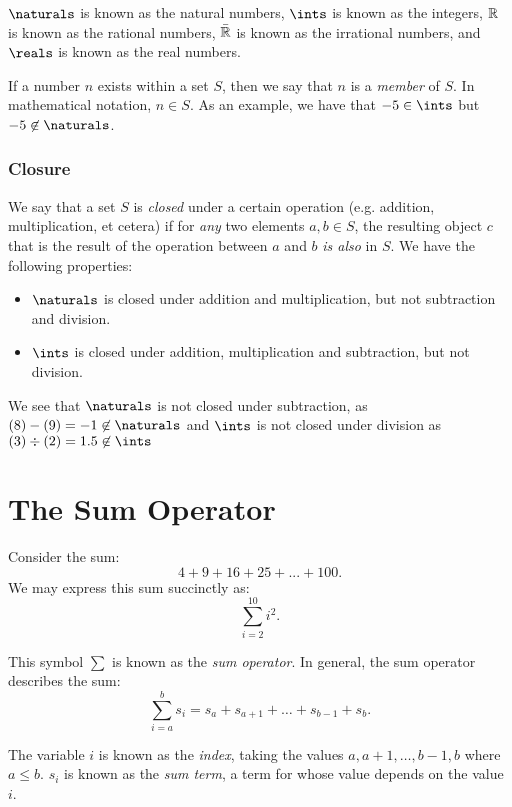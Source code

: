 \documentclass[../proofs.tex]{subfiles}
\begin{document}
  $\naturals$ is known as the natural numbers, $\ints$ is known as the integers,
  $\mathbb{R}$ is known as the rational numbers, $\bar{\mathbb{R}}$ is known as
  the irrational numbers, and $\reals$ is known as the real numbers.

  If a number $n$ exists within a set $S$, then we say that $n$ is a
  \emph{member} of $S$. In mathematical notation, $n \in S$. As an example, we
  have that $-5 \in \ints$ but $-5 \not\in \naturals$.

  \subsubsection*{Closure}
  We say that a set $S$ is \emph{closed} under a certain operation (e.g.
  addition, multiplication, et cetera) if for \emph{any} two elements
  $a, b \in S$, the resulting object $c$ that is the result of the operation
  between $a$ and $b$ \emph{is also} in $S$. We have the following properties:

  \begin{itemize}
    \item $\naturals$ is closed under addition and multiplication, but not
    subtraction and division.
    \item $\ints$ is closed under addition, multiplication and subtraction, but
    not division.
  \end{itemize}

  We see that $\naturals$ is not closed under subtraction, as
  $(8) - (9) = -1 \not \in \naturals$ and $\ints$ is not closed under division
  as $(3) \div (2) = 1.5 \not\in \ints $

\section{The Sum Operator}
  \newcommand{\negfrac}[1]{\frac{ (-1)^{#1} }{ #1! } }

  Consider the sum: $$ 4 + 9 + 16 + 25 + ... + 100. $$
  We may express this sum succinctly as: $$ \sum_{i=2}^{10}{i^2}. $$

  This symbol $\sum$ is known as the \emph{sum operator}. In general, the sum
  operator describes the sum:
  $$ \sum_{i=a}^{b}{s_i} = s_a + s_{a+1} + \ldots + s_{b-1} + s_b. $$

  The variable $i$ is known as the \emph{index}, taking the values
  $a, a+1, \ldots, b-1, b$ where $a \leq b$. $s_i$ is known as the
  \emph{sum term}, a term for whose value depends on the value $i$.
\end{document}
